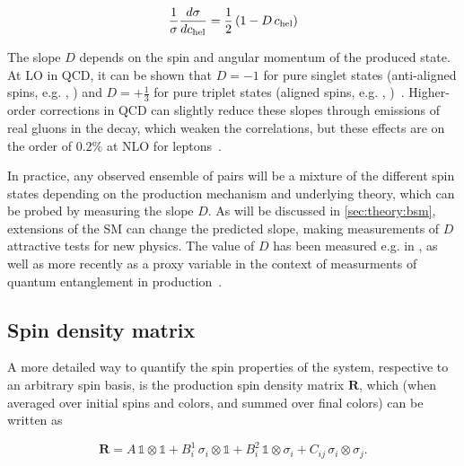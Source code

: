 \begin{equation}
\label{eq:theory:chel}
    \frac{1}{\sigma} \frac{d \sigma}{d c_{\mathrm{hel}}} = \frac{1}{2} \left( 1 - D \, c_{\mathrm{hel}} \right)
\end{equation}

The slope $D$ depends on the spin and angular momentum of the produced \ttbar state. At LO in QCD, it can be shown that $D=-1$ for pure singlet states (anti-aligned spins, e.g. , ) and $D=+\frac{1}{3}$ for pure triplet states (aligned spins, e.g. , )~\cite{Maltoni:2024tul}. Higher-order corrections in QCD can slightly reduce these slopes through emissions of real gluons in the decay, which weaken the correlations, but these effects are on the order of $0.2\%$ at NLO for leptons~\cite{Czarnecki:1990pe,Bernreuther:2003ga}. %

In practice, any observed ensemble of \ttbar pairs will be a mixture of the different spin states depending on the production mechanism and underlying theory, which can be probed by measuring the slope $D$. As will be discussed in \cref{sec:theory:bsm}, extensions of the SM can change the predicted slope, making measurements of $D$ attractive tests for new physics. The value of $D$ has been measured e.g. in , as well as more recently as a proxy variable in the context of measurments of quantum entanglement in \ttbar production~\cite{CMS:TOP-23-001,ATLAS:2023fsd}.


\subsection{Spin density matrix}
\label{sec:theory:spindensity}

A more detailed way to quantify the spin properties of the \ttbar system, respective to an arbitrary spin basis, is the production spin density matrix $\mathbf{R}$, which (when averaged over initial spins and colors, and summed over final colors) can be written as~\cite{Maltoni:2024tul,Anuar:PhD}

\begin{equation}
    \mathbf{R} = A \, \mathbb{1} \otimes \mathbb{1}
    + B_i^1 \, \sigma_i \otimes \mathbb{1}
    + B_i^2 \, \mathbb{1} \otimes \sigma_i
    + C_{ij} \, \sigma_i \otimes \sigma_j.
\end{equation}

